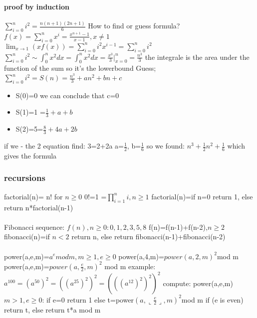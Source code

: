 \documentclass[a4paper,10pt]{article}
\begin{document}
\paragraph{proof by induction}
$\sum_{i=0}^ni^2=\frac{n(n+1)(2n+1)}{6}$
\newline
How to find or guess formula?
\newline
$f(x)=\sum_{i=0}^nx^i=\frac{x^{n+1}-1}{x-1},x\neq 1$
\newline
$\lim_{x\to 1}(xf(x))=\sum_{i=0}^ni^2x^{i-1}=\sum_{i=0}^ni^2$
\newline
$\sum_{i=0}^ni^2\sim\int_{0}^nx^2dx=\int_0^n x^2dx=\frac{x^3}{3}|_{x=0}^n=\frac{n^3}{3}$ 
\newline
the integrale is the area under the function of the sum so it's the lowerbound 
\newline
Guess;$\sum_{i=0}^ni^2=S(n)=\frac{n^3}{3}+an^2+bn+c$
\begin{itemize}
 \item S(0)=0 we can conclude that c=0
 \item S(1)=1 =$\frac{1}{3}+a+b$
 \item S(2)=5=$\frac{8}{3}+4a+2b$
\end{itemize}
if we - the 2 equation find: 3=2+2a
\newline
a=$\frac{1}{2}$, b=$\frac{1}{6}$ so we found: $n^3+\frac{1}{2}n^2+\frac{1}{6}$ which gives the formula
\subsubsection{recursions}
factorial(n)= n! for $n\geq0$ 0!=1 =$\prod_{i=1}^ni,n\geq 1$
\newline
factorial(n)=if n=0 return 1, else return n*factorial(n-1)
\paragraph{}
Fibonacci sequence:
\newline
$f(n), n\geq 0:0,1,2,3,5,8$
\newline
f(n)=f(n-1)+f(n-2),$n\geq2$
\newline
fibonacci(n)=if $n<2$ return n, else return fibonacci(n-1)+fibonacci(n-2)
\paragraph{}
power(a,e,m)=$a^emodm,m\geq1,e\geq0$
\newline
power(a,4,m)=$power(a,2,m)^2$mod m
\newline
power(a,e,m)=$power(a,\frac{e}{2},m)^2$ mod m
\newline
example:$a^{100}=(a^{50})^2=((a^{25})^2)^2=(((a^{12})^2)^2)^2$
\newline
compute: power(a,e,m) $m>1,e\geq0$: if e=0 return 1
\newline
else t=power$(a,\llcorner\frac{e}{2}\lrcorner,m)^2$mod m 
\newline
if (e is even) return t, else return t*a mod m
\end{document}

